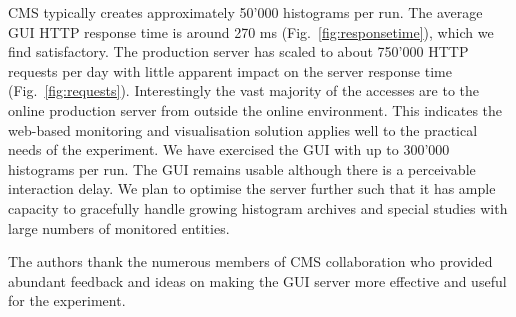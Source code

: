 \documentclass[a4paper]{jpconf}
\begin{document}
CMS typically creates approximately 50'000 histograms per run.  The average
GUI HTTP response time is around 270 ms (Fig.~\ref{fig:responsetime}),
which we find satisfactory.  The production server has scaled to about
750'000 HTTP requests per day with little apparent impact on the
server response time (Fig.~\ref{fig:requests}).  Interestingly the
vast majority of the accesses are to the online production server from
outside the online environment.  This indicates the web-based
monitoring and visualisation solution applies well to the practical
needs of the experiment.  We have exercised the GUI with up to 300'000
histograms per run.  The GUI remains usable although there is a
perceivable interaction delay.  We plan to optimise the server further
such that it has ample capacity to gracefully handle growing histogram
archives and special studies with large numbers of monitored entities.


\ack

The authors thank the numerous members of CMS collaboration who
provided abundant feedback and ideas on making the GUI server more
effective and useful for the experiment.

\end{document}
